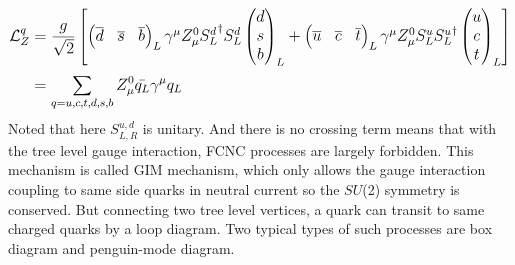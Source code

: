 \begin{equation}
\large
\begin{split}
\mathcal{L}^q_Z & = \frac{g}{\sqrt{2}}
\begin{bmatrix}
\begin{pmatrix}
\overline{d}&\overline{s}&\overline{b}
\end{pmatrix}_L
\gamma^\mu Z^{0}_{\mu}
{S^{d}_{L}}^{\dag}
S^{d}_{L}
\begin{pmatrix}
d\\s\\b\\
\end{pmatrix}_L+
\begin{pmatrix}
\overline{u}&\overline{c}&\overline{t}
\end{pmatrix}_L
\gamma^\mu Z^{0}_{\mu}
S^{u}_{L}
{S^{u}_{L}}^{\dag}
\begin{pmatrix}
u\\c\\t\\
\end{pmatrix}_L
\end{bmatrix} \\
& = \sum_{q=u,c,t,d,s,b}^{}  Z^{0}_{\mu}\bar{q_L} \gamma^\mu q_L
\end{split}
\end{equation}
Noted that here $S^{u,d}_{L,R}$ is unitary. And there is no crossing term means that with the tree level gauge interaction, FCNC processes are largely forbidden. This mechanism is called GIM mechanism, which only allows the gauge interaction coupling to same side quarks in neutral current so the $SU$(2) symmetry is conserved. But connecting two tree level vertices, a quark can transit to same charged quarks by a loop diagram. Two typical types of such processes are box diagram and penguin-mode diagram. 

